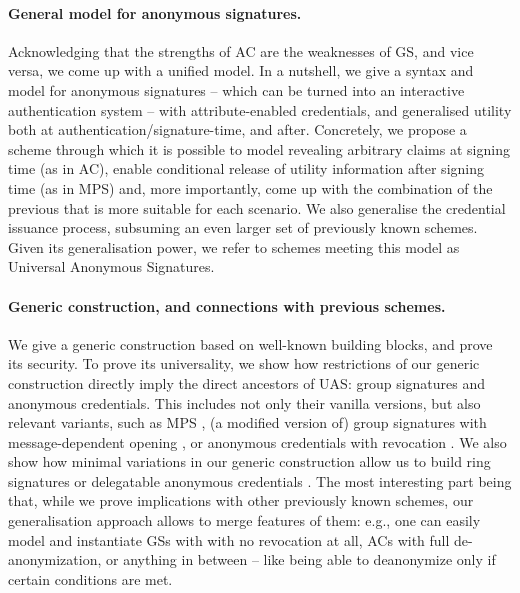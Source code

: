 \paragraph{General model for anonymous signatures.} %
Acknowledging that the strengths of AC are the weaknesses of GS, and vice versa,
we come up with a unified model. In a nutshell, we give a syntax and model for
anonymous signatures -- which can be turned into an interactive authentication
system -- with attribute-enabled credentials, and generalised utility both at
authentication/signature-time, and after. Concretely, we propose a scheme
through which it is possible to model revealing arbitrary claims at signing time
(as in AC), enable conditional release of utility information after signing time
(as in MPS) and, more importantly, come up with the combination of the previous
that is more suitable for each scenario. We also generalise the credential
issuance process, subsuming an even larger set of previously known schemes.
Given its generalisation power, we refer to schemes meeting this model as
Universal Anonymous Signatures.

\paragraph{Generic construction, and connections with previous schemes.} %
We give a generic construction based on well-known building blocks, and prove
its security. To prove its universality, we show how restrictions of our generic
construction directly imply the direct ancestors of UAS: group signatures and
anonymous credentials. This includes not only their vanilla versions, but also
relevant variants, such as MPS \cite{ngsy22}, (a modified version of) group
signatures with message-dependent opening \cite{seh+12}, or anonymous
credentials with revocation \cite{cks10}. We also show how minimal variations in
our generic construction allow us to build ring signatures \cite{rst06} or
delegatable anonymous credentials \cite{bcc+09}. The most interesting part being
that, while we prove implications with other previously known schemes, our
generalisation approach allows to merge features of them: e.g., one can easily
model and instantiate GSs with with no revocation at all, ACs with full
de-anonymization, or anything in between -- like being able to deanonymize only
if certain conditions are met.

